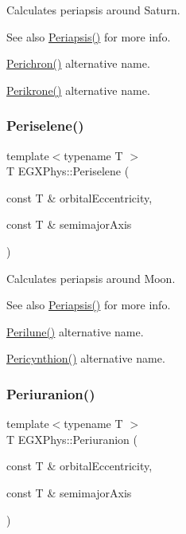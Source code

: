 Calculates periapsis around Saturn. 

\begin{DoxySeeAlso}{See also}
\hyperlink{group___astrophysics_ga4414ac75539371ec874a3d25cad6c9fe}{Periapsis()} for more info. 

\hyperlink{group___astrophysics_ga12b5e99aa2e3e7031ef6ce93060cf516}{Perichron()} alternative name. 

\hyperlink{group___astrophysics_gaa56f74c44a3583b8f0d13b821c1d7422}{Perikrone()} alternative name. 
\end{DoxySeeAlso}
\mbox{\label{group___astrophysics_ga255874374dde571531e443cdbef9ef0c}} 
\subsubsection{\texorpdfstring{Periselene()}{Periselene()}}
{\footnotesize\ttfamily template$<$typename T $>$ \\
T E\+G\+X\+Phys\+::\+Periselene (\begin{DoxyParamCaption}\item[{const T \&}]{orbital\+Eccentricity,  }\item[{const T \&}]{semimajor\+Axis }\end{DoxyParamCaption})}



Calculates periapsis around Moon. 

\begin{DoxySeeAlso}{See also}
\hyperlink{group___astrophysics_ga4414ac75539371ec874a3d25cad6c9fe}{Periapsis()} for more info. 

\hyperlink{group___astrophysics_ga2cc7ab05e18d32c94d8d74972e032793}{Perilune()} alternative name. 

\hyperlink{group___astrophysics_gaeeba153b188cd06cbd233eaef12f0a6a}{Pericynthion()} alternative name. 
\end{DoxySeeAlso}
\mbox{\label{group___astrophysics_gab8b8131a617dd2d2a4de1d48accd7442}} 
\subsubsection{\texorpdfstring{Periuranion()}{Periuranion()}}
{\footnotesize\ttfamily template$<$typename T $>$ \\
T E\+G\+X\+Phys\+::\+Periuranion (\begin{DoxyParamCaption}\item[{const T \&}]{orbital\+Eccentricity,  }\item[{const T \&}]{semimajor\+Axis }\end{DoxyParamCaption})}



